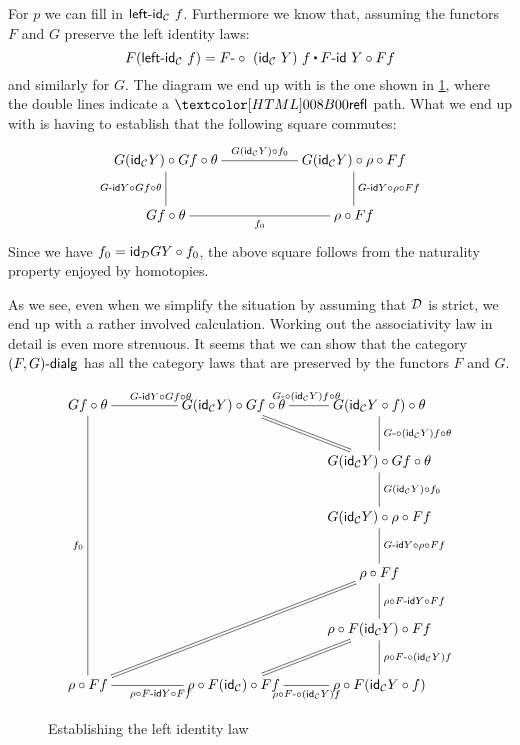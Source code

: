 For $p$ we can fill in $\leftid_{\Cc}\ f$. Furthermore we know that,
assuming the functors $F$ and $G$ preserve the left identity laws:
$$
F (\leftid_{\Cc}\ f) = \trans{\Fcomp\ (\id_{\Cc}\ Y)\ f}{\Fid\ Y \circ Ff}
$$
and similarly for $G$. The diagram we end up with is the one shown in
\cref{left-identity-calculation}, where the double lines indicate a
$\refl$ path. What we end up with is having to establish that the
following square commutes:
$$
\xymatrix{
G (\id_{\Cc} Y) \circ Gf \circ \theta
\ar@{-}[rr]^{G (\id_{\Cc} Y) \circ f_0}
\ar@{-}[d]_{\Gid Y \circ G f \circ \theta}
&&G (\id_{\Cc} Y) \circ \rho \circ Ff
\ar@{-}[d]^{\Gid Y \circ \rho \circ Ff}
\\
Gf \circ \theta
\ar@{-}[rr]_{f_0}
&&\rho \circ Ff
}
$$
Since we have $f_0 = \id_{\Dd} GY \circ f_0$, the above square follows
from the naturality property enjoyed by homotopies.

As we see, even when we simplify the situation by assuming that $\mathcal{D}$
is strict, we end up with a rather involved calculation.  Working out
the associativity law in detail is even more strenuous. It seems that
we can show that the category $\dialgcat{F}{G}$ has all the category
laws that are preserved by the functors $F$ and $G$.

\begin{figure}
  \centering
  $$
\xymatrix@!C@!R{
G f \circ \theta %
\ar@{-}[r]^{\Gid Y \circ Gf \circ \theta}
\ar@{-}[ddddd]_{f_0}
&
G (\id_{\Cc} Y) \circ Gf \circ \theta %
\ar@{-}[r]^{\Gcomp (\id_{\Cc} Y) f \circ \theta}
\ar@{=}[rd]
&G (\id_{\Cc} Y \circ f) \circ \theta %
\ar@{-}[d]^{\Gcomp (\id_{\Cc} Y) f \circ \theta}
\\
&&G (\id_{\Cc} Y) \circ Gf \circ \theta %
\ar@{-}[d]^{G (\id_{\Cc} Y) \circ f_0}
\\
&&G (\id_{\Cc} Y) \circ \rho \circ Ff %
\ar@{-}[d]^{\Gid Y \circ \rho \circ Ff}
\\
&&\rho \circ Ff %
\ar@{-}[d]^{\rho \circ \Fid Y \circ Ff}
\\
&&\rho \circ F (\id_{\Cc} Y) \circ Ff %
\ar@{-}[d]^{\rho \circ \Fcomp (\id_{\Cc} Y) f}
\\
\rho \circ Ff %
\ar@{-}[r]_{\rho \circ \Fid Y \circ Ff}
\ar@{=}[uurr]
&\rho \circ F (\id_{\Cc}) \circ Ff %
\ar@{-}[r]_{\rho \circ \Fcomp (\id_{\Cc} Y) f}
\ar@{=}[ur]
&\rho \circ F (\id_{\Cc} Y \circ f) %
}
$$

\caption{Establishing the left identity law}
\label{left-identity-calculation}
\end{figure}

